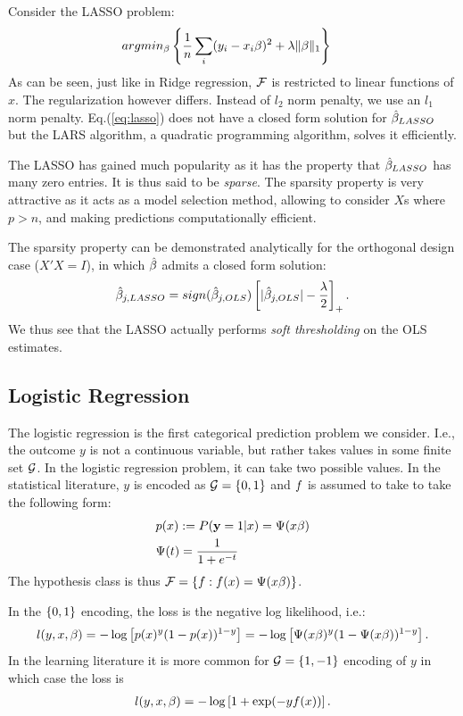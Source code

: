 Consider the LASSO problem:
\begin{align}
\label{eq:lasso}
	& argmin_{\beta}\left\{ \frac{1}{n}\sum_i (y_i-x_i\beta)^2 + \lambda \Vert \beta \Vert_1 \right\} 
\end{align}
As can be seen, just like in Ridge regression, $\mathcal{F}$ is restricted to linear functions of $x$. The regularization however differs. Instead of $l_2$ norm penalty, we use an $l_1$ norm penalty.
Eq.(\ref{eq:lasso}) does not have a closed form solution for $\hat{\beta}_{LASSO}$ but the LARS algorithm, a quadratic programming algorithm, solves it efficiently.



The LASSO has gained much popularity as it has the property that $\hat{\beta}_{LASSO}$ has many zero entries. It is thus said to be \emph{sparse}.
The sparsity property is very attractive as it acts as a model selection method, allowing to consider $X$s where $p>n$, and making predictions computationally efficient.

The sparsity property can be demonstrated analytically for the orthogonal design case ($X'X=I$), in which $\hat{\beta}$ admits a closed form solution:
\begin{align}
	\hat{\beta}_{j,LASSO} = sign(\hat{\beta}_{j,OLS}) \left[|\hat{\beta}_{j,OLS}|-\frac{\lambda}{2} \right]_+.
\end{align}
We thus see that the LASSO actually performs \emph{soft thresholding} on the OLS estimates. 




\subsection{Logistic Regression}
\label{sec:logistic}
The logistic regression is the first categorical prediction problem we consider. 
I.e., the outcome $y$ is not a continuous variable, but rather takes values in some finite set $\mathcal{G}$. In the logistic regression problem, it can take two possible values.
In the statistical literature, $y$ is encoded as $\mathcal{G}=\left\{ 0,1 \right\}$ and $f$ is assumed to take to take the following form:
\begin{align}
	& p(x):= P(\mathbf{y}=1|x) = \Psi(x\beta) \\
	& \Psi(t) = \frac{1}{1+e^{-t}}
\end{align}
The hypothesis class is thus  $\mathcal{F}=\left\{ f:f(x)=\Psi(x\beta) \right\} $.

In the $\left\{ 0,1 \right\}$ encoding, the loss is the negative log likelihood, i.e.:
\begin{align}
	l(y,x,\beta) = 
	-\log \left[ p(x)^{y} (1-p(x))^{1-y}  \right] =
	-\log \left[ \Psi(x\beta)^{y} (1-\Psi(x\beta))^{1-y}  \right].
\end{align}
In the learning literature it is more common for $\mathcal{G}=\left\{ 1,-1 \right\}$ encoding of $y$ in which case the loss is 
\begin{align}
	l(y,x,\beta) = -\log \left[ 1+\exp(-y f(x))  \right].
\end{align}


